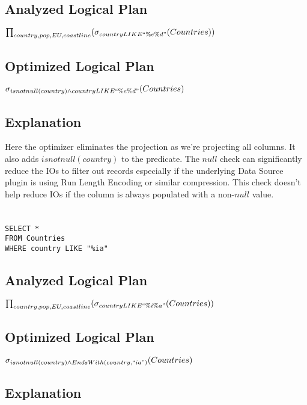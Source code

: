 \documentclass[12pt]{article}
\begin{document}
\subsection*{Analyzed Logical Plan}
$\prod_{country, pop, EU, coastline}(\sigma_{country LIKE ``\%e\%d"}(Countries))$

\subsection*{Optimized Logical Plan}
$\sigma_{isnotnull(country) \wedge country LIKE ``\%e\%d"}(Countries)$

\subsection*{Explanation}

Here the optimizer eliminates the projection as we're projecting all columns. It also adds $isnotnull(country)$ to the predicate. The $null$ check can significantly reduce the IOs to filter out records especially if the underlying Data Source plugin is using Run Length Encoding or similar compression. This check doesn't help reduce IOs if the column is always populated with a non-$null$ value.

\newpage

\section{}
\begin{verbatim}
SELECT *
FROM Countries
WHERE country LIKE "%ia"
\end{verbatim}

\subsection*{Analyzed Logical Plan}
$\prod_{country, pop, EU, coastline}(\sigma_{country LIKE ``\%i\%a"}(Countries))$


\subsection*{Optimized Logical Plan}
$\sigma_{isnotnull(country) \wedge EndsWith(country, ``ia")}(Countries)$


\subsection*{Explanation}
\end{document}
